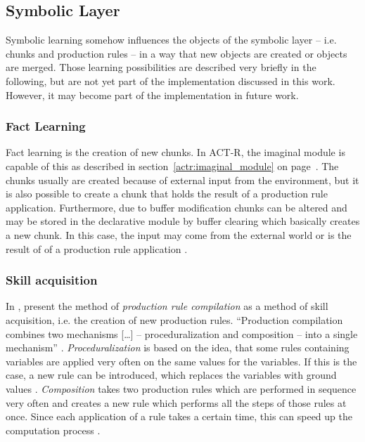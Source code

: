 \subsection{Symbolic Layer}

Symbolic learning somehow influences the objects of the symbolic layer -- i.e. chunks and production rules -- in a way that new objects are created or objects are merged. Those learning possibilities are described very briefly in the following, but are not yet part of the implementation discussed in this work. However, it may become part of the implementation in future work.

\subsubsection{Fact Learning}

Fact learning is the creation of new chunks. In ACT-R, the imaginal module is capable of this as described in section~\ref{actr:imaginal_module} on page~\pageref{actr:imaginal_module}. The chunks usually are created because of external input from the environment, but it is also possible to create a chunk that holds the result of a production rule application. Furthermore, due to buffer modification chunks can be altered and may be stored in the declarative module by buffer clearing which basically creates a new chunk. In this case, the input may come from the external world or is the result of of a production rule application \cite[7]{whitehill_understanding}.

\subsubsection{Skill acquisition}

In \cite{taatgen_production_2003}, \citeauthor{taatgen_production_2003} present the method of \emph{production rule compilation} as a method of skill acquisition, i.e. the creation of new production rules. ``Production compilation combines two mechanisms [\dots] -- proceduralization and composition -- into a single mechanism'' \cite[62]{taatgen_production_2003}. \emph{Proceduralization} is based on the idea, that some rules containing variables are applied very often on the same values for the variables. If this is the case, a new rule can be introduced, which replaces the variables with ground values \cite[7]{whitehill_understanding}. \emph{Composition} takes two production rules which are performed in sequence very often and creates a new rule which performs all the steps of those rules at once. Since each application of a rule takes a certain time, this can speed up the computation process \cite[7]{whitehill_understanding}.

